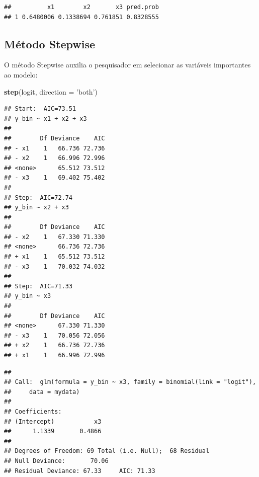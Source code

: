 \documentclass[12pt,brazil,]{book}
\newenvironment{Shaded}{\begin{snugshade}}{\end{snugshade}}
\newcommand{\DataTypeTok}[1]{\textcolor[rgb]{0.13,0.29,0.53}{#1}}
\newcommand{\KeywordTok}[1]{\textcolor[rgb]{0.13,0.29,0.53}{\textbf{#1}}}
\newcommand{\NormalTok}[1]{#1}
\newcommand{\OperatorTok}[1]{\textcolor[rgb]{0.81,0.36,0.00}{\textbf{#1}}}
\newcommand{\StringTok}[1]{\textcolor[rgb]{0.31,0.60,0.02}{#1}}
\begin{document}
\begin{Shaded}
\end{Shaded}

\begin{verbatim}
##          x1        x2       x3 pred.prob
## 1 0.6480006 0.1338694 0.761851 0.8328555
\end{verbatim}

\hypertarget{metodo-stepwise}{%
\subsection{Método Stepwise}\label{metodo-stepwise}}

O método Stepwise auxilia o pesquisador em selecionar as variáveis
importantes ao modelo:

\begin{Shaded}
\begin{Highlighting}[]
\KeywordTok{step}\NormalTok{(logit, }\DataTypeTok{direction =} \StringTok{'both'}\NormalTok{)}
\end{Highlighting}
\end{Shaded}

\begin{verbatim}
## Start:  AIC=73.51
## y_bin ~ x1 + x2 + x3
## 
##        Df Deviance    AIC
## - x1    1   66.736 72.736
## - x2    1   66.996 72.996
## <none>      65.512 73.512
## - x3    1   69.402 75.402
## 
## Step:  AIC=72.74
## y_bin ~ x2 + x3
## 
##        Df Deviance    AIC
## - x2    1   67.330 71.330
## <none>      66.736 72.736
## + x1    1   65.512 73.512
## - x3    1   70.032 74.032
## 
## Step:  AIC=71.33
## y_bin ~ x3
## 
##        Df Deviance    AIC
## <none>      67.330 71.330
## - x3    1   70.056 72.056
## + x2    1   66.736 72.736
## + x1    1   66.996 72.996
\end{verbatim}

\begin{verbatim}
## 
## Call:  glm(formula = y_bin ~ x3, family = binomial(link = "logit"), 
##     data = mydata)
## 
## Coefficients:
## (Intercept)           x3  
##      1.1339       0.4866  
## 
## Degrees of Freedom: 69 Total (i.e. Null);  68 Residual
## Null Deviance:       70.06 
## Residual Deviance: 67.33     AIC: 71.33
\end{verbatim}
\end{document}
